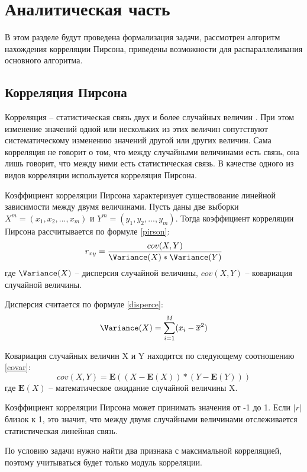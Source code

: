 \chapter{Аналитическая часть}
В этом разделе будут проведена формализация задачи, рассмотрен
алгоритм нахождения корреляции Пирсона, приведены возможности для
распараллеливания основного алгоритма.

\section{Корреляция Пирсона}
Корреляция -- статистическая связь двух и более случайных величин \cite{pirson}.
При этом изменение значений одной или нескольких из этих величин сопутствуют систематическому изменению значений другой или других величин.
Сама корреляция не говорит о том, что между случайными величинами есть связь, она лишь говорит, что между ними есть статистическая связь.
В качестве одного из видов корреляции используется корреляция Пирсона.

Коэффициент корреляции Пирсона характеризует существование линейной зависимости между двумя величинами.
Пусть даны две выборки $X^m = (x_1, x_2, ..., x_m)$ и $Y^m = (y_1, y_2, ..., y_m)$. 
Тогда коэффициент корреляции Пирсона рассчитывается по формуле \ref{pirson}:
\begin{equation} \label{pirson}
	r_{xy} = \frac{cov(X, Y)}{\Variance(X) * \Variance(Y)}
\end{equation}
где $\Variance(X)$ -- дисперсия случайной величины, $cov(X, Y)$ -- ковариация случайной величины.

Дисперсия считается по формуле \ref{disperce}:
\begin{equation} \label{disperce}
	\Variance(X) = \sum\limits_{i=1}^M (x_i - \overline{x}^2)
\end{equation}

Ковариация случайных величин X и Y находится по следующему соотношению \ref{covar}:
\begin{equation} \label{covar}
	cov(X, Y) = \mathbf{E}((X - \mathbf{E}(X)) * (Y - \mathbf{E}(Y)))
\end{equation}
где $\mathbf{E}(X)$ -- математическое ожидание случайной величины X.

Коэффициент корреляции Пирсона может принимать значения от -1 до 1.
Если $|r|$ близок к 1, это значит, что между двумя случайными величинами
отслеживается статистическая линейная связь.

По условию задачи нужно найти два признака с максимальной корреляцией, поэтому
учитываться будет только модуль корреляции.

